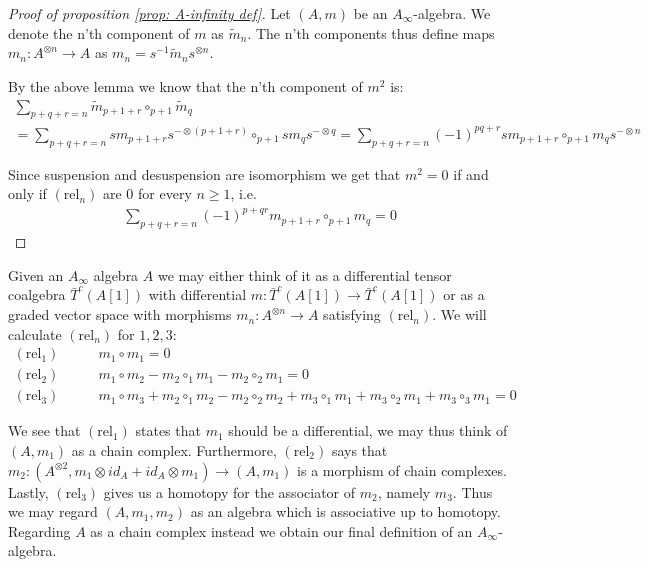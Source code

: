 \documentclass[../thesis.tex]{subfiles}
\begin{document}
        \begin{proof}[Proof of proposition \ref{prop: A-infinity def}]
            Let $(A,m)$ be an $A_\infty$-algebra. We denote the n'th component of $m$ as $\widetilde{m}_n$. The n'th components thus define maps $m_n:A^{\otimes n}\rightarrow A$ as $m_n = s^{-1}\widetilde{m}_ns^{\otimes n}$.

            By the above lemma we know that the n'th component of $m^2$ is:
            \begin{multline*}
                \sum_{p + q + r = n}\widetilde{m}_{p+1+r}\circ_{p+1}\widetilde{m}_q \\
                = \sum_{p + q + r = n}sm_{p+1+r}s^{-\otimes (p+1+r)}\circ_{p+1}sm_qs^{-\otimes q} = \sum_{p + q + r = n}(-1)^{pq+r}sm_{p+1+r}\circ_{p+1}m_q s^{-\otimes n}
            \end{multline*}

            Since suspension and desuspension are isomorphism we get that $m^2 = 0$ if and only if $(\text{rel}_n)$ are $0$ for every $n\geq 1$, i.e.
            \begin{align*}
                \sum_{p+q+r = n} (-1)^{p+qr} m_{p+1+r} \circ_{p+1} m_q = 0
            \end{align*}
        \end{proof}

        Given an $A_\infty$ algebra $A$ we may either think of it as a differential tensor coalgebra $\bar{T}^c(A[1])$ with differential $m: \bar{T}^c(A[1])\rightarrow \bar{T}^c(A[1])$ or as a graded vector space with morphisms $m_n:A^{\otimes n} \rightarrow A$ satisfying $(\text{rel}_n)$. We will calculate $(\text{rel}_n)$ for $1,2,3$:
        \begin{align*}
            (\text{rel}_1)\qquad & m_1\circ m_1 = 0 \\
            (\text{rel}_2)\qquad & m_1\circ m_2 - m_2\circ_{1}m_1 - m_2\circ_2m_1 = 0 \\
            (\text{rel}_3)\qquad & m_1\circ m_3 + m_2\circ_1 m_2 - m_2\circ_2m_2 + m_3\circ_1m_1 + m_3\circ_2m_1 + m_3\circ_3m_1 = 0 
        \end{align*}

        We see that $(\text{rel}_1)$ states that $m_1$ should be a differential, we may thus think of $(A, m_1)$ as a chain complex. Furthermore, $(\text{rel}_2)$ says that $m_2 : (A^{\otimes 2}, m_1\otimes id_A + id_A\otimes m_1) \rightarrow (A, m_1)$ is a morphism of chain complexes. Lastly, $(\text{rel}_3)$ gives us a homotopy for the associator of $m_2$, namely $m_3$. Thus we may regard $(A, m_1, m_2)$ as an algebra which is associative up to homotopy. Regarding $A$ as a chain complex instead we obtain our final definition of an $A_\infty$-algebra.
\end{document}
